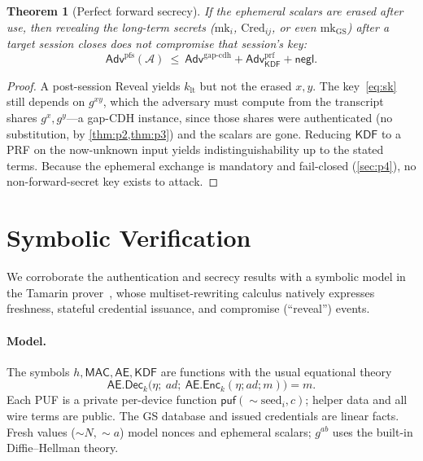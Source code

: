 \documentclass[11pt,a4paper]{article}
\theoremstyle{jrnlplain}
\newtheorem{theorem}{Theorem}
\theoremstyle{jrnldef}
\newcommand{\GS}{\mathrm{GS}}
\newcommand{\Cred}{\mathrm{Cred}}
\newcommand{\mk}{\mathrm{mk}}
\newcommand{\MAC}{\mathsf{MAC}}
\newcommand{\aead}{\mathsf{AE}}
\newcommand{\Enc}{\mathsf{Enc}}
\newcommand{\Dec}{\mathsf{Dec}}
\newcommand{\KDF}{\mathsf{KDF}}
\newcommand{\adv}{\mathcal{A}}
\newcommand{\negl}{\mathsf{negl}}
\newcommand{\Adv}{\mathsf{Adv}}
\begin{document}
\begin{theorem}[Perfect forward secrecy]\label{thm:pfs}
If the ephemeral scalars are erased after use, then revealing the long-term
secrets ($\mk_i$, $\Cred_{ij}$, or even $\mk_{\GS}$) \emph{after} a target
session closes does not compromise that session's key:
\begin{equation}
\Adv^{\mathrm{pfs}}(\adv)\ \le\
\Adv^{\mathrm{gap\text{-}cdh}}+\Adv^{\mathrm{prf}}_{\KDF}+\negl.
\end{equation}
\end{theorem}
\begin{proof}
A post-session \textsf{Reveal} yields $k_{\mathrm{lt}}$ but not the erased
$x,y$. The key~\eqref{eq:sk} still depends on $g^{xy}$, which the adversary
must compute from the transcript shares $g^{x},g^{y}$---a gap-CDH instance,
since those shares were authenticated (no substitution, by
\cref{thm:p2,thm:p3}) and the scalars are gone. Reducing $\KDF$ to a PRF on
the now-unknown input yields indistinguishability up to the stated terms.
Because the ephemeral exchange is mandatory and fail-closed (\cref{sec:p4}),
no non-forward-secret key exists to attack.
\end{proof}

\section{Symbolic Verification}
\label{sec:symbolic}
We corroborate the authentication and secrecy results with a symbolic model
in the Tamarin prover~\cite{tamarin2013}, whose multiset-rewriting calculus
natively expresses freshness, stateful credential issuance, and compromise
(``reveal'') events.

\paragraph{Model.}
The symbols $h,\MAC,\aead,\KDF$ are functions with the usual equational
theory
\begin{equation}
\aead.\Dec_k\big(\eta;\ \mathit{ad};\ \aead.\Enc_k(\eta;\mathit{ad};m)\big)=m.
\end{equation}
Each PUF is a private per-device function $\mathsf{puf}(\sim\!\mathrm{seed}_i,c)$;
helper data and all wire terms are public. The GS database and issued
credentials are linear facts. Fresh values ($\sim\!N,\sim\!a$) model nonces and
ephemeral scalars; $g^{ab}$ uses the built-in Diffie--Hellman theory.
\end{document}
